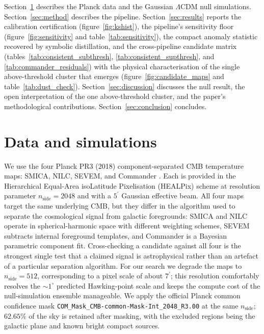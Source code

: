 \documentclass[a4paper,11pt]{article}
\providecommand{\arcmin}{^{\prime}}
\begin{document}
Section~\ref{sec:data} describes the Planck data and the Gaussian $\Lambda$CDM null simulations. Section~\ref{sec:method} describes the pipeline. Section~\ref{sec:results} reports the calibration certification (figure~\ref{fig:kshist}), the pipeline's sensitivity floor (figure~\ref{fig:sensitivity} and table~\ref{tab:sensitivity}), the compact anomaly statistic recovered by symbolic distillation, and the cross-pipeline candidate matrix (tables~\ref{tab:consistent_subthresh}, \ref{tab:consistent_supthresh}, and \ref{tab:commander_residuals}) with the physical characterisation of the single above-threshold cluster that emerges (figure~\ref{fig:candidate_maps} and table~\ref{tab:dust_check}). Section~\ref{sec:discussion} discusses the null result, the open interpretation of the one above-threshold cluster, and the paper's methodological contributions. Section~\ref{sec:conclusion} concludes.

\section{Data and simulations}\label{sec:data}

We use the four Planck PR3 (2018) component-separated CMB temperature maps: SMICA, NILC, SEVEM, and Commander \citep{planck2018_iv}. Each is provided in the Hierarchical Equal-Area isoLatitude Pixelisation (HEALPix) scheme \citep{gorski_2005} at resolution parameter $n_{\text{side}} = 2048$ and with a $5\arcmin$ Gaussian effective beam. All four maps target the same underlying CMB, but they differ in the algorithm used to separate the cosmological signal from galactic foregrounds: SMICA and NILC operate in spherical-harmonic space with different weighting schemes, SEVEM subtracts internal foreground templates, and Commander is a Bayesian parametric component fit. Cross-checking a candidate against all four is the strongest single test that a claimed signal is astrophysical rather than an artefact of a particular separation algorithm. For our search we degrade the maps to $n_{\text{side}} = 512$, corresponding to a pixel scale of about $7\arcmin$; this resolution comfortably resolves the $\sim 1^\circ$ predicted Hawking-point scale and keeps the compute cost of the null-simulation ensemble manageable. We apply the official Planck common confidence mask \texttt{COM\_Mask\_CMB-common-Mask-Int\_2048\_R3.00} at the same $n_{\text{side}}$; $62.65\%$ of the sky is retained after masking, with the excluded regions being the galactic plane and known bright compact sources.
\end{document}
